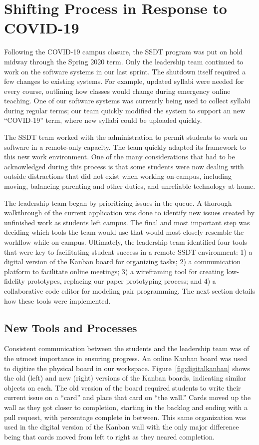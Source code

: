 \section{Shifting Process in Response to COVID-19}

Following the COVID-19 campus closure, the SSDT program was put on hold midway through the Spring 2020 term. Only the leadership team continued to work on the software systems in our last sprint. The shutdown itself required a few changes to existing systems. For example, updated syllabi were needed for every course, outlining how classes would change during emergency online teaching. One of our software systems was currently being used to collect syllabi during regular terms; our team quickly modified the system to support an new ``COVID-19'' term, where new syllabi could be uploaded quickly.

The SSDT team worked with the administration to permit students to work on software in a remote-only capacity. The team quickly adapted its framework to this new work environment. One of the many considerations that had to be acknowledged during this process is that some students were now dealing with outside distractions that did not exist when working on-campus, including moving, balancing parenting and other duties, and unreliable technology at home.

The leadership team began by prioritizing issues in the queue. A thorough walkthrough of the current application was done to identify new issues created by unfinished work as students left campus. The final and most important step was deciding which tools the team would use that would most closely resemble the workflow while on-campus. Ultimately, the leadership team identified four tools that were key to facilitating student success in a remote SSDT environment: 1) a digital version of the Kanban board for organizing tasks; 2) a communication platform to facilitate online meetings; 3) a wireframing tool for creating low-fidelity prototypes, replacing our paper prototyping process; and 4) a collaborative code editor for modeling pair programming. The next section details how these tools were implemented.

\subsection{New Tools and Processes}
Consistent communication between the students and the leadership team was of the utmost importance in ensuring progress. An online Kanban board was used to digitize the physical board in our workspace. Figure~\ref{fig:digitalkanban} shows the old (left) and new (right) versions of the Kanban boards, indicating similar objects on each. The old version of the board required students to write their current issue on a ``card'' and place that card on ``the wall.'' Cards moved up the wall as they got closer to completion, starting in the backlog and ending with a pull request, with percentage complete in between. This same organization was used in the digital version of the Kanban wall with the only major difference being that cards moved from left to right as they neared completion.

